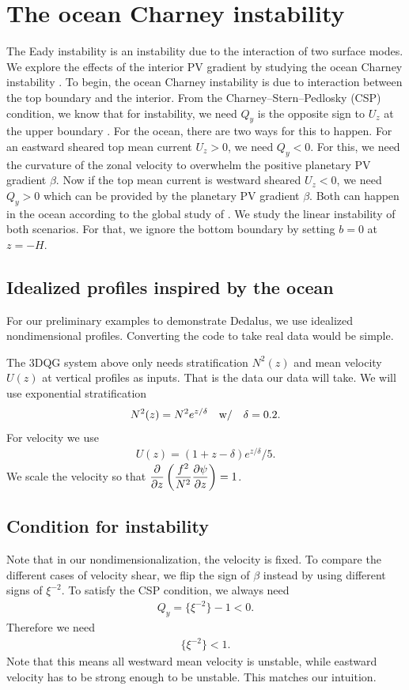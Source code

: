 \section{The ocean Charney instability}
The Eady instability is an instability due to the interaction of two surface modes. We explore the effects of the interior PV gradient by studying the ocean Charney instability \parencite{CapetEtAl_16}. To begin, the ocean Charney instability is due to interaction between the top boundary and the interior. From the Charney–Stern–Pedlosky (CSP) condition, we know that for instability, we need $Q_y$ is the opposite sign to $U_z$ at the upper boundary \parencite[p. 351]{Vallis_17}. For the ocean, there are two ways for this to happen. For an eastward sheared top mean current $U_z>0$, we need $Q_y<0$. For this, we need the curvature of the zonal velocity to overwhelm the positive planetary PV gradient $\beta$. Now if the top mean current is westward sheared $U_z<0$, we need $Q_y>0$ which can be provided by the planetary PV gradient $\beta$. Both can happen in the ocean according to the global study of \cite{TullochEtAl_11}. We study the linear instability of both scenarios. For that, we ignore the bottom boundary by setting $b=0$ at $z=-H$.

\subsection{Idealized profiles inspired by the ocean}
For our preliminary examples to demonstrate Dedalus, we use idealized nondimensional profiles. Converting the code to take real data would be simple. 

The 3DQG system above only needs stratification $N^2(z)$ and mean velocity $U(z)$ at vertical profiles as inputs. That is the data our data will take. We will use exponential stratification
\begin{align}
    N^2(z) = N^2 e^{z/\delta} \quad \mbox{w/} \quad \delta=0.2.
\end{align}
For velocity we use
\begin{align}
    U(z) = (1+z-\delta)e^{z/\delta}/5.
\end{align}
We scale the velocity so that $\displaystyle{\frac{\partial}{\partial z}\left(\frac{f^2}{N^2}\frac{\partial\psi}{\partial z}\right)}=1$. 

\subsection{Condition for instability}
Note that in our nondimensionalization, the velocity is fixed. To compare the different cases of velocity shear, we flip the sign of $\beta$ instead by using different signs of $\xi^{-2}$. To satisfy the CSP condition, we always need 
\begin{align}
    Q_y = \{\xi^{-2}\}-1<0.
\end{align}
Therefore we need
\begin{align}
    \{\xi^{-2}\}<1.
\end{align}
Note that this means all westward mean velocity is unstable, while eastward velocity has to be strong enough to be unstable. This matches our intuition.

